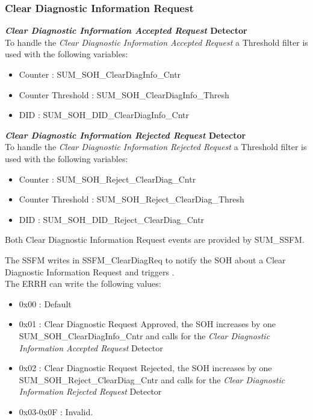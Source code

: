 \subsubsection{Clear Diagnostic Information Request}
{
    \textbf{\textit{Clear Diagnostic Information Accepted Request} Detector}\\
    To handle the \textit{Clear Diagnostic Information Accepted Request} a Threshold filter is used  with the following variables:
    \begin{itemize}
        \item Counter               : SUM_SOH_ClearDiagInfo_Cntr
        \item Counter Threshold     : SUM_SOH_ClearDiagInfo_Thresh
        \item DID                   : SUM_SOH_DID_ClearDiagInfo_Cntr
    \end{itemize}
}
{
      
}

{
    \textbf{\textit{Clear Diagnostic Information Rejected Request} Detector}\\
    To handle the \textit{Clear Diagnostic Information Rejected Request} a Threshold filter is used  with the following variables:
    \begin{itemize}
        \item Counter               : SUM_SOH_Reject_ClearDiag_Cntr
        \item Counter Threshold     : SUM_SOH_Reject_ClearDiag_Thresh
        \item DID                   : SUM_SOH_DID_Reject_ClearDiag_Cntr
    \end{itemize}
}
{
      
}

{
	Both Clear Diagnostic Information Request events are provided by SUM_SSFM.

	The SSFM writes in SSFM_ClearDiagReq to notify the SOH about a Clear Diagnostic Information Request and triggers .\\
	The ERRH can write the following values:
	\begin{itemize}
		\item 0x00		:	Default
		\item 0x01		:	Clear Diagnostic Request Approved, the SOH increases by one SUM_SOH_ClearDiagInfo_Cntr and calls  for the \textit{Clear Diagnostic Information Accepted Request} Detector
		\item 0x02		:	Clear Diagnostic Request Rejected, the SOH increases by one SUM_SOH_Reject_ClearDiag_Cntr and calls  for the \textit{Clear Diagnostic Information Rejected Request} Detector
		\item 0x03-0x0F	:	Invalid.
	\end{itemize}
}
{
   
}


